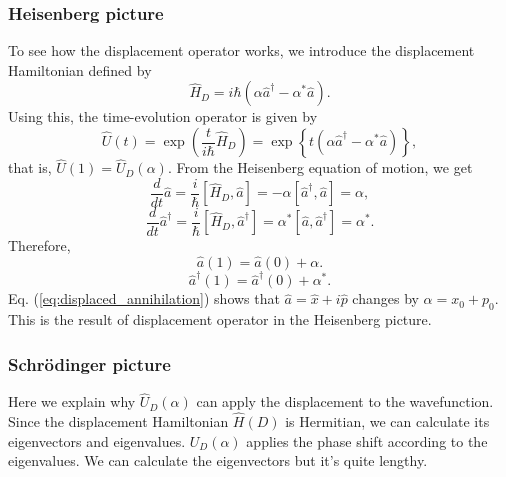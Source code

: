 \documentclass{book}
\begin{document}
\subsubsection{Heisenberg picture}
To see how the displacement operator works, we introduce the displacement Hamiltonian defined by
\begin{equation}
  \hat H_D = i\hbar (\alpha \hat a^\dagger - \alpha^* \hat a).
\end{equation}
Using this, the time-evolution operator is given by
\begin{equation}
\hat U(t) = \exp\left(\frac{t}{i\hbar}\hat H_D\right) = \exp\left\{t(\alpha\hat a^\dagger - \alpha^* \hat a)\right\},
\end{equation}
that is, $\hat U(1) = \hat U_D(\alpha)$. From the Heisenberg equation of motion, we get
\begin{equation}
 \frac{d}{dt}\hat a = \frac i \hbar[\hat H_D, \hat a] = -\alpha [\hat a^\dagger, \hat a] = \alpha,
\end{equation}
\begin{equation}
  \frac{d}{dt}\hat a^\dagger = \frac i \hbar [\hat H_D, \hat a^\dagger] = \alpha^*[\hat a, \hat a^\dagger] = \alpha^*.
\end{equation}
Therefore,
\begin{equation}
  \hat a(1) = \hat a(0) + \alpha.
  \label{eq:displaced_annihilation}
\end{equation}
\begin{equation}
  \hat a^\dagger(1) = \hat a^\dagger(0) + \alpha ^*.
  \label{eq:displaced_creation}
\end{equation}
Eq. (\ref{eq:displaced_annihilation}) shows that $\hat a = \hat x + i\hat p$ changes by $\alpha = x_0 + p_0$. This is the result of displacement operator in the Heisenberg picture.

\subsubsection{Schr\"odinger picture}
Here we explain why $\hat U_D(\alpha)$ can apply the displacement to the wavefunction. Since the displacement Hamiltonian $\hat H(D)$ is Hermitian, we can calculate its eigenvectors and eigenvalues. $U_D(\alpha)$ applies the phase shift according to the eigenvalues. We can calculate the eigenvectors but it's quite lengthy.
\end{document}

